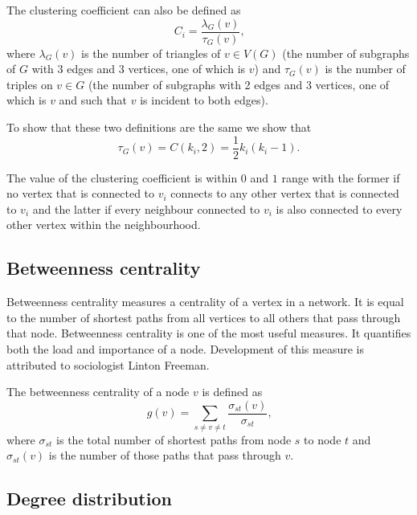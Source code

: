         The clustering coefficient can also be defined as
        \begin{equation}
          C_i = \frac{\lambda_G(v)}{\tau_G(v)} \mbox{,}
        \end{equation}
        where $\lambda_G(v)$ is the number of triangles of $v \in V(G)$ (the number of subgraphs of $G$ with 3 edges and 3 vertices, one of which is $v$) and $\tau_G(v)$ is the number of triples on $v \in G$ (the number of subgraphs with 2 edges and 3 vertices, one of which is $v$ and such that $v$ is incident to both edges).

        To show that these two definitions are the same we show that
        \begin{equation}
          \tau_G(v) = C({k_i},2) = \frac{1}{2}k_i(k_i-1) \mbox{.}
        \end{equation}

        The value of the clustering coefficient is within $0$ and $1$ range with the former if no vertex that is connected to $v_i$ connects to any other vertex that is connected to $v_i$ and the latter if every neighbour connected to $v_i$ is also connected to every other vertex within the neighbourhood.

    \subsection{Betweenness centrality}

      Betweenness centrality measures a centrality of a vertex in a network. It is equal to the number of shortest paths from all vertices to all others that pass through that node. Betweenness centrality is one of the most useful measures. It quantifies both the load and importance of a node. Development of this measure is attributed to sociologist Linton Freeman\cite{Freeman1977}.

      The betweenness centrality of a node $v$ is defined as
      \begin{equation}
        g(v) = \sum_{s \neq v \neq t} \frac{\sigma_{st}(v)}{\sigma_{st}} \mbox{,}
      \end{equation}
      where $\sigma_{st}$ is the total number of shortest paths from node $s$ to node $t$ and $\sigma_{st}(v)$ is the number of those paths that pass through $v$.

    \subsection{Degree distribution}

